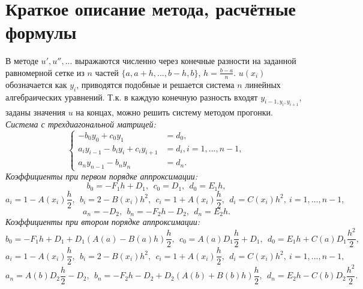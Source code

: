 \documentclass[a4paper,12pt]{article}
\begin{document}
\section{\normalsize{Краткое описание метода, расчётные формулы}}
\begin{flushleft}
  В методе $u', u'', ...$ выражаются численно через конечные разности на заданной равномерной сетке из $n$ частей $\{a,a+h, ..., b-h, b\}$, $h=\frac{b-a}{n}$.
  \linebreak\linebreak
  $u(x_i)$ обозначается как $y_i$, приводятся подобные и решается система $n$ линейных алгебраических уравнений.
  Т.к. в каждую конечную разность входят $y_{i-1, y_i, y_{i+1}}$, заданы значения $u$ на концах, можно решить систему методом прогонки.
  \linebreak\linebreak
  \textit{Система с трехдиагональной матрицей:}
  \begin{equation*}
    \left\{
      \begin{array}{lr}
          -b_0y_0 + c_0y_1 & = d_0,\\
        a_iy_{i-1} - b_iy_i + c_iy_{i+1} & = d_i, i = 1,...,n-1, \\
        a_ny_{n-1}-b_ny_n & = d_n.
      \end{array}
    \right.
  \end{equation*}
  \textit{Коэффициенты при первом порядке аппроксимации:}
  \begin{equation*}
    b_0 = -F_1h + D_1,~~c_0 = D_1,~~d_0=E_1h,
  \end{equation*}
  \begin{equation*}
    a_i = 1 - A(x_i)\frac{h}{2},~~b_i=2-B(x_i)h^2,~~c_i=1+A(x_i)\frac{h}{2},~~d_i=C(x_i)h^2,~i=1,...,n-1,
  \end{equation*}
  \begin{equation*}
    a_n=-D_2,~~b_n=-F_2h-D_2,~~d_n=E_2h.
  \end{equation*}
  \textit{Коэффициенты при втором порядке аппроксимации:}
  \begin{equation*}
    b_0 = -F_1h + D_1 + D_1(A(a)-B(a)h)\frac{h}{2},~~c_0 = A(a)D_1\frac{h}{2} + D_1,~~d_0=E_1h+C(a)D_1\frac{h^2}{2},
  \end{equation*}
  \begin{equation*}
    a_i = 1 - A(x_i)\frac{h}{2},~~b_i=2-B(x_i)h^2,~~c_i=1+A(x_i)\frac{h}{2},~~d_i=C(x_i)h^2,~i=1,...,n-1,
  \end{equation*}
  \begin{equation*}
    a_n=A(b)D_2\frac{h}{2}-D_2,~~b_n=-F_2h-D_2+D_2(A(b)+B(b)h)\frac{h}{2},~~d_n=E_2h-C(b)D_2\frac{h^2}{2}.
  \end{equation*}
\end{flushleft}
\end{document}
